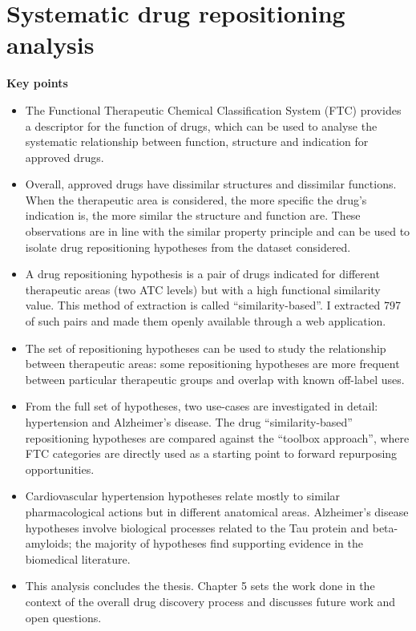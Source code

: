 \chapter{Systematic drug repositioning analysis}

\textbf{Key points}
\begin{itemize}
  \item The Functional Therapeutic Chemical Classification System (FTC) provides a descriptor for the function of drugs, which can be used to analyse the systematic relationship between function, structure and indication for approved drugs.
  \item Overall, approved drugs have dissimilar structures and dissimilar functions. When the therapeutic area is considered, the more specific the drug’s indication is, the more similar the structure and function are. These observations are in line with the similar property principle and can be used to isolate drug repositioning hypotheses from the dataset considered.
  \item A drug repositioning hypothesis is a pair of drugs indicated for different therapeutic areas (two ATC levels) but with a high functional similarity value. This method of extraction is called “similarity-based”. I extracted 797 of such pairs and made them openly available through a web application.
  \item The set of repositioning hypotheses can be used to study the relationship between therapeutic areas: some repositioning hypotheses are more frequent between particular therapeutic groups and overlap with known off-label uses.
  \item From the full set of hypotheses, two use-cases are investigated in detail: hypertension and Alzheimer's disease. The drug “similarity-based” repositioning hypotheses are compared against the “toolbox approach”, where FTC categories are directly used as a starting point to forward repurposing opportunities.
  \item Cardiovascular hypertension hypotheses relate mostly to similar pharmacological actions but in different anatomical areas. Alzheimer's disease hypotheses involve biological processes related to the Tau protein and beta-amyloids; the majority of hypotheses find supporting evidence in the biomedical literature.
  \item This analysis concludes the thesis. Chapter 5 sets the work done in the context of the overall drug discovery process and discusses future work and open questions.
\end{itemize}

